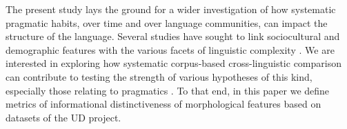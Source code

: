 \documentclass[USenglish]{article}
\begin{document}
The present study lays the ground for a wider investigation of how systematic pragmatic habits, over time and over language communities, can impact the structure of the language.
Several studies have sought to link sociocultural and demographic features with the various facets of linguistic complexity \citep{wray2007consequences,lupyan2010language,shcherbakova2023societies,levinson2024dark,dale_lupyan_2012}.
We are interested in exploring how systematic corpus-based cross-linguistic comparison can contribute to testing the strength of various hypotheses of this kind, especially those relating to pragmatics \citep{hall1976beyond,cardon2008critique,meyer2016culture}.
To that end, in this paper we define metrics of informational distinctiveness of morphological features based on datasets of the UD project. 

\end{document}
